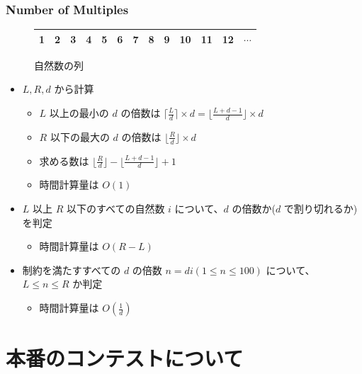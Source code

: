 \documentclass[t, aspectratio=169, dvipdfmx]{beamer}
\begin{document}
\begin{frame}
  \frametitle{Number of Multiples}
  \begin{figure}
    \begin{tabular}{*{13}{|c}|}  & 2 & 3 & 4 & 5 & 6 & 7 & 8 & 9 & 10 & 11 & 12 & $\cdots$ \\ \hline
    \end{tabular}
    \caption{自然数の列}
  \end{figure}
  \begin{itemize}
    \item $L,R,d$ から計算
    \begin{itemize}
      \item $L$ 以上の最小の $d$ の倍数は $\lceil\frac{L}{d}\rceil \times d=\lfloor\frac{L+d-1}{d}\rfloor \times d$
      \item $R$ 以下の最大の $d$ の倍数は $\lfloor\frac{R}{d}\rfloor \times d$
      \item 求める数は $\lfloor\frac{R}{d}\rfloor - \lfloor\frac{L+d-1}{d}\rfloor + 1$
      \item 時間計算量は $O(1)$
    \end{itemize}
    \item $L$ 以上 $R$ 以下のすべての自然数 $i$ について、$d$ の倍数か($d$ で割り切れるか)を判定
    \begin{itemize}
      \item 時間計算量は $O(R-L)$
    \end{itemize}
    \item 制約を満たすすべての $d$ の倍数 $n=di(1 \leq n \leq 100)$ について、 $L \leq n \leq R$ か判定
    \begin{itemize}
      \item 時間計算量は $O(\frac{1}{d})$
    \end{itemize}
  \end{itemize}
\end{frame}

\section{本番のコンテストについて}
\frame{\sectionpage}
\end{document}
